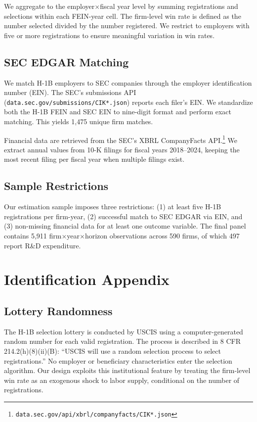 \documentclass[12pt]{article}
\begin{document}
We aggregate to the employer$\times$fiscal year level by summing registrations and selections within each FEIN-year cell. The firm-level win rate is defined as the number selected divided by the number registered. We restrict to employers with five or more registrations to ensure meaningful variation in win rates.

\subsection{SEC EDGAR Matching}

We match H-1B employers to SEC companies through the employer identification number (EIN). The SEC's submissions API (\texttt{data.sec.gov/submissions/CIK*.json}) reports each filer's EIN. We standardize both the H-1B FEIN and SEC EIN to nine-digit format and perform exact matching. This yields 1,475 unique firm matches.

Financial data are retrieved from the SEC's XBRL CompanyFacts API.\footnote{\texttt{data.sec.gov/api/xbrl/companyfacts/CIK*.json}} We extract annual values from 10-K filings for fiscal years 2018--2024, keeping the most recent filing per fiscal year when multiple filings exist.

\subsection{Sample Restrictions}

Our estimation sample imposes three restrictions: (1) at least five H-1B registrations per firm-year, (2) successful match to SEC EDGAR via EIN, and (3) non-missing financial data for at least one outcome variable. The final panel contains 5,911 firm$\times$year$\times$horizon observations across 590 firms, of which 497 report R\&D expenditure.

\section{Identification Appendix}

\subsection{Lottery Randomness}

The H-1B selection lottery is conducted by USCIS using a computer-generated random number for each valid registration. The process is described in 8 CFR 214.2(h)(8)(ii)(B): ``USCIS will use a random selection process to select registrations.'' No employer or beneficiary characteristics enter the selection algorithm. Our design exploits this institutional feature by treating the firm-level win rate as an exogenous shock to labor supply, conditional on the number of registrations.
\end{document}
